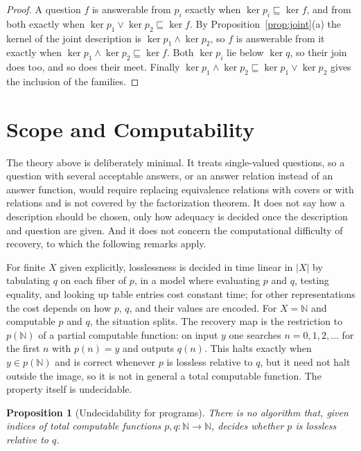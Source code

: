 \documentclass[11pt]{article}
\newtheorem{proposition}[theorem]{Proposition}
\theoremstyle{definition}
\theoremstyle{remark}
\newcommand{\refines}{\sqsubseteq}
\newcommand{\meet}{\wedge}
\newcommand{\join}{\vee}
\newcommand{\N}{\mathbb{N}}
\begin{document}
\begin{proof}
A question $f$ is answerable from $p_i$ exactly when $\ker p_i\refines\ker f$, and from both exactly when $\ker p_1\join\ker p_2\refines\ker f$. By Proposition~\ref{prop:joint}(a) the kernel of the joint description is $\ker p_1\meet\ker p_2$, so $f$ is answerable from it exactly when $\ker p_1\meet\ker p_2\refines\ker f$. Both $\ker p_i$ lie below $\ker q$, so their join does too, and so does their meet. Finally $\ker p_1\meet\ker p_2\refines\ker p_1\join\ker p_2$ gives the inclusion of the families.
\end{proof}

\section{Scope and Computability}\label{sec:scope}

The theory above is deliberately minimal. It treats single-valued questions, so a question with several acceptable answers, or an answer relation instead of an answer function, would require replacing equivalence relations with covers or with relations and is not covered by the factorization theorem. It does not say how a description should be chosen, only how adequacy is decided once the description and question are given. And it does not concern the computational difficulty of recovery, to which the following remarks apply.

For finite $X$ given explicitly, losslessness is decided in time linear in $|X|$ by tabulating $q$ on each fiber of $p$, in a model where evaluating $p$ and $q$, testing equality, and looking up table entries cost constant time; for other representations the cost depends on how $p$, $q$, and their values are encoded. For $X=\N$ and computable $p$ and $q$, the situation splits. The recovery map is the restriction to $p(\N)$ of a partial computable function: on input $y$ one searches $n=0,1,2,\ldots$ for the first $n$ with $p(n)=y$ and outputs $q(n)$. This halts exactly when $y\in p(\N)$ and is correct whenever $p$ is lossless relative to $q$, but it need not halt outside the image, so it is not in general a total computable function. The property itself is undecidable.

\begin{proposition}[Undecidability for programs]\label{prop:undecidable}
There is no algorithm that, given indices of total computable functions $p,q:\N\to\N$, decides whether $p$ is lossless relative to $q$.
\end{proposition}
\end{document}

